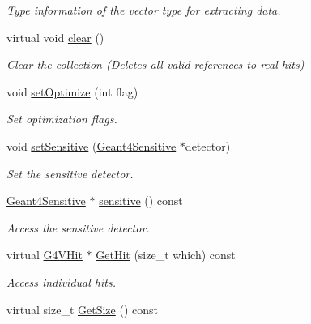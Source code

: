 \begin{DoxyCompactItemize}
\begin{DoxyCompactList}\small\item\em Type information of the vector type for extracting data. \end{DoxyCompactList}\item 
virtual void \hyperlink{class_d_d4hep_1_1_simulation_1_1_geant4_hit_collection_a02e7c1123e909477f4b7951e94c10768}{clear} ()
\begin{DoxyCompactList}\small\item\em Clear the collection (Deletes all valid references to real hits) \end{DoxyCompactList}\item 
void \hyperlink{class_d_d4hep_1_1_simulation_1_1_geant4_hit_collection_a163e9842ded780e1f39dbe6701c132d8}{set\+Optimize} (int flag)
\begin{DoxyCompactList}\small\item\em Set optimization flags. \end{DoxyCompactList}\item 
void \hyperlink{class_d_d4hep_1_1_simulation_1_1_geant4_hit_collection_a5d4547aa0f97d5ef2391986f634806d5}{set\+Sensitive} (\hyperlink{class_d_d4hep_1_1_simulation_1_1_geant4_sensitive}{Geant4\+Sensitive} $\ast$detector)
\begin{DoxyCompactList}\small\item\em Set the sensitive detector. \end{DoxyCompactList}\item 
\hyperlink{class_d_d4hep_1_1_simulation_1_1_geant4_sensitive}{Geant4\+Sensitive} $\ast$ \hyperlink{class_d_d4hep_1_1_simulation_1_1_geant4_hit_collection_a5ea6233e9c0a4534b830c87d71151cb0}{sensitive} () const
\begin{DoxyCompactList}\small\item\em Access the sensitive detector. \end{DoxyCompactList}\item 
virtual \hyperlink{class_g4_v_hit}{G4\+V\+Hit} $\ast$ \hyperlink{class_d_d4hep_1_1_simulation_1_1_geant4_hit_collection_a5d2a282043b247ee47e891a47637a006}{Get\+Hit} (size\+\_\+t which) const
\begin{DoxyCompactList}\small\item\em Access individual hits. \end{DoxyCompactList}\item 
virtual size\+\_\+t \hyperlink{class_d_d4hep_1_1_simulation_1_1_geant4_hit_collection_adccefc2f8a73f693d2b87b146db87d44}{Get\+Size} () const

\end{DoxyCompactItemize}
